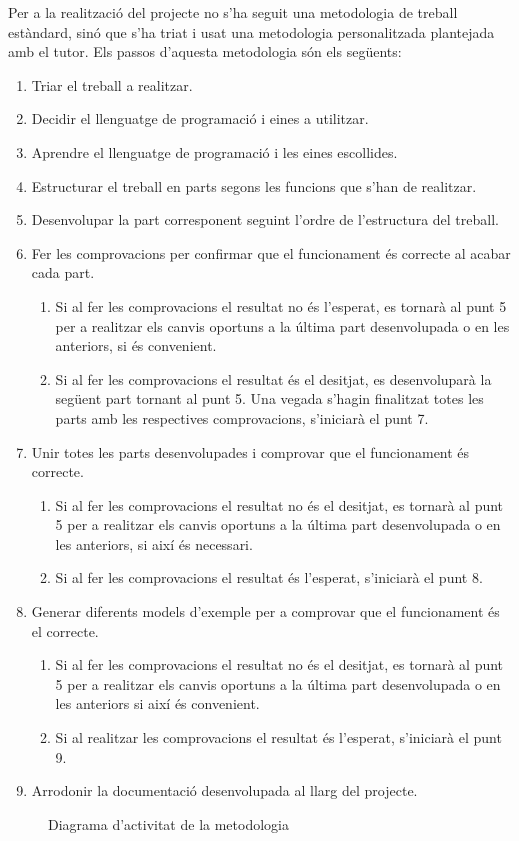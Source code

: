Per a la realització del projecte no s’ha seguit una metodologia de treball
estàndard, sinó que s’ha triat i usat una metodologia personalitzada plantejada
amb el tutor. Els passos d’aquesta metodologia són els següents:
\begin{enumerate}
  \item Triar el treball a realitzar.
  \item Decidir el llenguatge de programació i eines a utilitzar.
  \item Aprendre el llenguatge de programació i les eines escollides.
  \item Estructurar el treball en parts segons les funcions que s'han de realitzar.
  \item Desenvolupar la part corresponent seguint l'ordre de l'estructura del treball.
  \item Fer les comprovacions per confirmar que el funcionament és correcte al acabar cada part.
  \begin{enumerate}
    \item Si al fer les comprovacions el resultat no és l'esperat, es tornarà al punt 5 per a realitzar els canvis oportuns a la última part desenvolupada o en les anteriors, si és convenient.
    \item Si al fer les comprovacions el resultat és el desitjat, es desenvoluparà la següent part tornant al punt 5. Una vegada s'hagin finalitzat totes les parts amb les respectives comprovacions, s'iniciarà el punt 7.
  \end{enumerate}
  \item Unir totes les parts desenvolupades i comprovar que el funcionament és correcte.
  \begin{enumerate}
    \item Si al fer les comprovacions el resultat no és el desitjat, es tornarà al punt 5 per a realitzar els canvis oportuns a la última part desenvolupada o en les anteriors, si així és necessari.
    \item Si al fer les comprovacions el resultat és l'esperat, s'iniciarà el punt 8.
  \end{enumerate}
  \item Generar diferents models d'exemple per a comprovar que el funcionament és el correcte.
  \begin{enumerate}
    \item Si al fer les comprovacions el resultat no és el desitjat, es tornarà al punt 5 per a realitzar els canvis oportuns a la última part desenvolupada o en les anteriors si així és convenient.
    \item Si al realitzar les comprovacions el resultat és l'esperat, s'iniciarà el punt 9.
  \end{enumerate}
  \item Arrodonir la documentació desenvolupada al llarg del projecte.
\end{enumerate}
\begin{figure}[htbp]
  \centering
  
  \caption{Diagrama d'activitat de la metodologia}
\end{figure}
